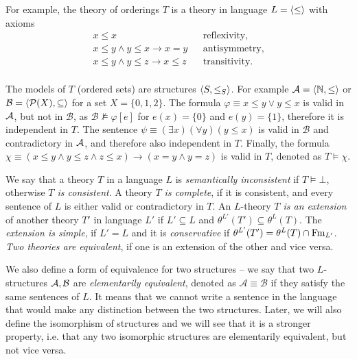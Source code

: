 
For example, the theory of orderings $T$ is a theory in language $L=\langle \leq \rangle$ with axioms
\begin{align*}
	x \leq x & & \text{reflexivity,} \\
	x \leq y \land y \leq x \to x = y & & \text{antisymmetry,} \\
	x \leq y \land y \leq z \to x \leq z & & \text{transitivity.} \\
\end{align*}

The models of $T$ (ordered sets) are structures $\langle S, \leq_S \rangle$. For example $\mathcal{A} = \langle \mathbb{N}, \leq \rangle$ or $\mathcal{B} = \langle \mathcal{P}(X), \subseteq \rangle$ for a set $X = \{0,1,2\}$. The formula $\varphi \equiv x \leq y \lor y \leq x$ is valid in $\mathcal{A}$, but not in $\mathcal{B}$, as $\mathcal{B} \nvDash \varphi[e]$ for $e(x) = \{0\}$ and $e(y)=\{1\}$, therefore it is independent in $T$. The sentence $\psi \equiv (\exists x)(\forall y)(y \leq x)$ is valid in $\mathcal{B}$ and contradictory in $\mathcal{A}$, and therefore also independent in $T$. Finally, the formula $\chi \equiv (x \leq y \land y \leq z \land z \leq x) \to (x = y \land y = z)$ is valid in $T$, denoted as $T \vDash \chi$.

We say that a theory $T$ in a language $L$ is \emph{semantically inconsistent} if $T \vDash \bot$, otherwise \emph{$T$ is consistent}. A theory \emph{$T$ is complete}, if it is consistent, and every sentence of $L$ is either valid or contradictory in $T$. An $L$-theory \emph{$T$ is an extension} of another theory $T'$ in language $L'$ if $L' \subseteq L$ and $\theta^{L'}(T') \subseteq \theta^L(T)$. The \emph{extension is simple}, if $L' = L$ and it is \emph{conservative} if $\theta^{L'}(T') = \theta^L(T) \cap \operatorname{Fm}_{L'}$. \emph{Two theories are equivalent}, if one is an extension of the other and vice versa.

We also define a form of equivalence for two structures -- we say that two $L$-structures $\mathcal{A}, \mathcal{B}$ are \emph{elementarily equivalent}, denoted as $\mathcal{A} \equiv \mathcal{B}$ if they satisfy the same sentences of $L$. It means that we cannot write a sentence in the language that would make any distinction between the two structures. Later, we will also define the isomorphism of structures and we will see that it is a stronger property, i.e. that any two isomorphic structures are elementarily equivalent, but not vice versa.


